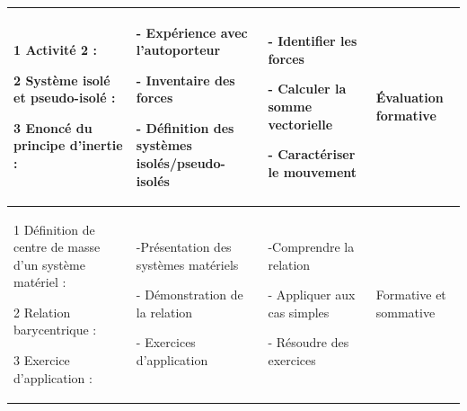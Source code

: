 \documentclass[13pt]{article}
\begin{document}
\begin{center}
\begin{tabular}{|p{}||p{}||p{}||p{}|}
		\color{red}{II  Principe d'inertie:}

		\vspace{0.5cm}
		\color{blue}1  Activité 2 :

		\color{blue}2 Système isolé et pseudo-isolé :
		\vspace{0.5cm}

		\color{blue}3 Enoncé du principe d’inertie :

		            &
		- Expérience avec l'autoporteur

		- Inventaire des forces

		- Définition des systèmes isolés/pseudo-isolés
		            &
		- Identifier les forces

		- Calculer la somme vectorielle

		- Caractériser le mouvement
		            &
		Évaluation formative
		\\\hline

		\color{red}{III  Relation barycentrique}

		\vspace{0.5cm}
		\color{blue}1  Définition de centre de masse d’un système matériel :

		\color{blue}2 Relation barycentrique :
		\vspace{0.5cm}

		\color{blue}3 Exercice d’application :


		            &
		-Présentation des systèmes matériels

		- Démonstration de la relation

		- Exercices d'application


		            &
		-Comprendre la relation

		- Appliquer aux cas simples

		- Résoudre des exercices
		            & Formative et sommative
		\\\hline
	\end{tabular}
\end{center}

\end{document}
